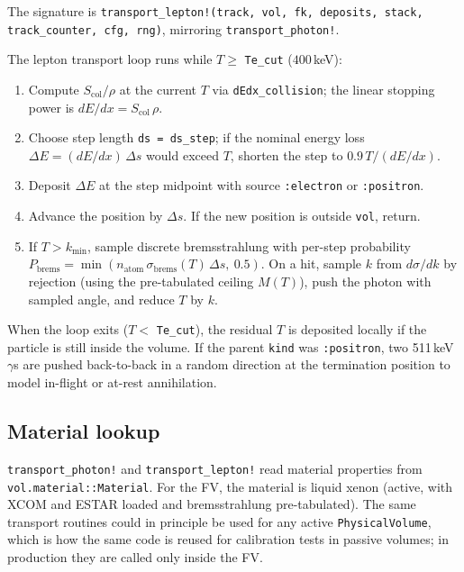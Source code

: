 \documentclass[11pt]{article}
\begin{document}
The signature is \texttt{transport\_lepton!(track, vol, fk, deposits,
stack, track\_counter, cfg, rng)}, mirroring \texttt{transport\_photon!}.

The lepton transport loop runs while $T \geq $ \texttt{Te\_cut} ($400$\,keV):

\begin{enumerate}[label=\arabic*.]
\item Compute $S_{\mathrm{col}}/\rho$ at the current $T$ via
\texttt{dEdx\_collision}; the linear stopping power is
$dE/dx = S_{\mathrm{col}}\,\rho$.
\item Choose step length \texttt{ds = ds\_step}; if the nominal energy loss
$\Delta E = (dE/dx)\,\Delta s$ would exceed $T$, shorten the step to
$0.9\,T/(dE/dx)$.
\item Deposit $\Delta E$ at the step midpoint with source
\texttt{:electron} or \texttt{:positron}.
\item Advance the position by $\Delta s$. If the new position is outside
\texttt{vol}, return.
\item If $T > k_{\min}$, sample discrete bremsstrahlung with per-step
probability $P_{\mathrm{brems}} = \min(n_{\mathrm{atom}}\,
\sigma_{\mathrm{brems}}(T)\,\Delta s,\ 0.5)$. On a hit, sample $k$ from
$d\sigma/dk$ by rejection (using the pre-tabulated ceiling $M(T)$), push the
photon with sampled angle, and reduce $T$ by $k$.
\end{enumerate}

When the loop exits ($T < $ \texttt{Te\_cut}), the residual $T$ is
deposited locally if the particle is still inside the volume. If the parent
\texttt{kind} was \texttt{:positron}, two 511\,keV $\gamma$s are pushed
back-to-back in a random direction at the termination position to model
in-flight or at-rest annihilation.

\subsection{Material lookup}
\label{sec:fullstack-materials}

\texttt{transport\_photon!} and \texttt{transport\_lepton!} read material
properties from \texttt{vol.material::Material}. For the FV, the material is
liquid xenon (active, with XCOM and ESTAR loaded and bremsstrahlung
pre-tabulated). The same transport routines could in principle be used for
any active \texttt{PhysicalVolume}, which is how the same code is reused for
calibration tests in passive volumes; in production they are called only
inside the FV.
\end{document}
